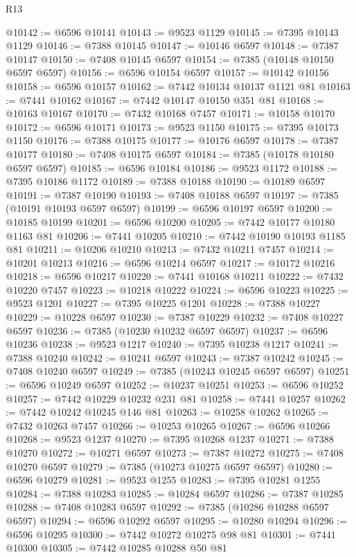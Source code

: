 \begin{lexlean}{R13}
\begin{coremodule}
@10142 := @6596 @10141
@10143 := @9523 @1129
@10145 := @7395 @10143 @1129
@10146 := @7388 @10145
@10147 := @10146 @6597
@10148 := @7387 @10147
@10150 := @7408 @10145 @6597
@10154 := @7385 (@10148 @10150 @6597 @6597)
@10156 := @6596 @10154 @6597
@10157 := @10142 @10156
@10158 := @6596 @10157
@10162 := @7442 @10134 @10137 @1121 @81
@10163 := @7441 @10162
@10167 := @7442 @10147 @10150 @351 @81
@10168 := @10163 @10167
@10170 := @7432 @10168 @7457
@10171 := @10158 @10170
@10172 := @6596 @10171
@10173 := @9523 @1150
@10175 := @7395 @10173 @1150
@10176 := @7388 @10175
@10177 := @10176 @6597
@10178 := @7387 @10177
@10180 := @7408 @10175 @6597
@10184 := @7385 (@10178 @10180 @6597 @6597)
@10185 := @6596 @10184
@10186 := @9523 @1172
@10188 := @7395 @10186 @1172
@10189 := @7388 @10188
@10190 := @10189 @6597
@10191 := @7387 @10190
@10193 := @7408 @10188 @6597
@10197 := @7385 (@10191 @10193 @6597 @6597)
@10199 := @6596 @10197 @6597
@10200 := @10185 @10199
@10201 := @6596 @10200
@10205 := @7442 @10177 @10180 @1163 @81
@10206 := @7441 @10205
@10210 := @7442 @10190 @10193 @1185 @81
@10211 := @10206 @10210
@10213 := @7432 @10211 @7457
@10214 := @10201 @10213
@10216 := @6596 @10214 @6597
@10217 := @10172 @10216
@10218 := @6596 @10217
@10220 := @7441 @10168 @10211
@10222 := @7432 @10220 @7457
@10223 := @10218 @10222
@10224 := @6596 @10223
@10225 := @9523 @1201
@10227 := @7395 @10225 @1201
@10228 := @7388 @10227
@10229 := @10228 @6597
@10230 := @7387 @10229
@10232 := @7408 @10227 @6597
@10236 := @7385 (@10230 @10232 @6597 @6597)
@10237 := @6596 @10236
@10238 := @9523 @1217
@10240 := @7395 @10238 @1217
@10241 := @7388 @10240
@10242 := @10241 @6597
@10243 := @7387 @10242
@10245 := @7408 @10240 @6597
@10249 := @7385 (@10243 @10245 @6597 @6597)
@10251 := @6596 @10249 @6597
@10252 := @10237 @10251
@10253 := @6596 @10252
@10257 := @7442 @10229 @10232 @231 @81
@10258 := @7441 @10257
@10262 := @7442 @10242 @10245 @146 @81
@10263 := @10258 @10262
@10265 := @7432 @10263 @7457
@10266 := @10253 @10265
@10267 := @6596 @10266
@10268 := @9523 @1237
@10270 := @7395 @10268 @1237
@10271 := @7388 @10270
@10272 := @10271 @6597
@10273 := @7387 @10272
@10275 := @7408 @10270 @6597
@10279 := @7385 (@10273 @10275 @6597 @6597)
@10280 := @6596 @10279
@10281 := @9523 @1255
@10283 := @7395 @10281 @1255
@10284 := @7388 @10283
@10285 := @10284 @6597
@10286 := @7387 @10285
@10288 := @7408 @10283 @6597
@10292 := @7385 (@10286 @10288 @6597 @6597)
@10294 := @6596 @10292 @6597
@10295 := @10280 @10294
@10296 := @6596 @10295
@10300 := @7442 @10272 @10275 @98 @81
@10301 := @7441 @10300
@10305 := @7442 @10285 @10288 @50 @81

\end{coremodule}
\end{lexlean}
